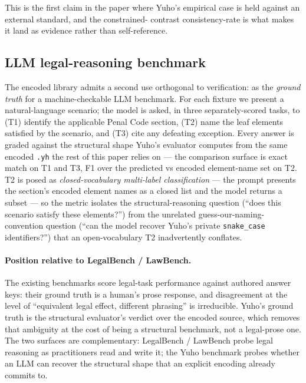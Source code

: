 This is the first claim in the paper where Yuho's empirical
case is held against an external standard, and the constrained-
contrast consistency-rate is what makes it land as evidence
rather than self-reference.

\subsection{LLM legal-reasoning benchmark}
\label{subsec:llm_benchmark}

The encoded library admits a second use orthogonal to verification:
as the \emph{ground truth} for a machine-checkable LLM benchmark.
For each fixture we present a natural-language scenario; the model
is asked, in three separately-scored tasks, to (T1) identify the
applicable Penal Code section, (T2) name the leaf elements
satisfied by the scenario, and (T3) cite any defeating exception.
Every answer is graded against the structural shape Yuho's
evaluator computes from the same encoded \texttt{.yh} the rest of
this paper relies on --- the comparison surface is exact match on
T1 and T3, F1 over the predicted vs encoded element-name set on T2.
T2 is posed as \emph{closed-vocabulary multi-label classification}
--- the prompt presents the section's encoded element names as a
closed list and the model returns a subset --- so the metric
isolates the structural-reasoning question (``does this scenario
satisfy these elements?'') from the unrelated guess-our-naming-
convention question (``can the model recover Yuho's private
\texttt{snake\_case} identifiers?'') that an open-vocabulary T2
inadvertently conflates.

\paragraph{Position relative to LegalBench / LawBench.} The
existing benchmarks
\cite{guha2024legalbench,fei2023lawbench} score legal-task
performance against authored answer keys: their ground truth is a
human's prose response, and disagreement at the level of
``equivalent legal effect, different phrasing'' is irreducible.
Yuho's ground truth is the structural evaluator's verdict over the
encoded source, which removes that ambiguity at the cost of being
a structural benchmark, not a legal-prose one. The two surfaces
are complementary: LegalBench / LawBench probe legal reasoning as
practitioners read and write it; the Yuho benchmark probes whether
an LLM can recover the structural shape that an explicit encoding
already commits to.

